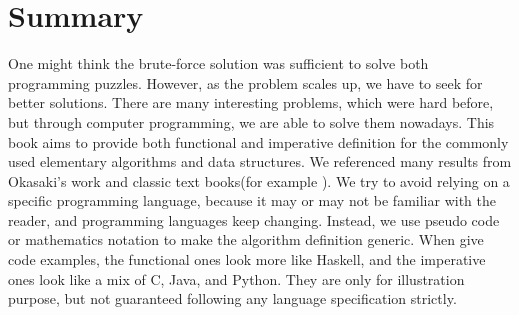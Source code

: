 \documentclass[b5paper]{article}
\begin{document}


\section{Summary}
One might think the brute-force solution was sufficient to solve both programming puzzles. However, as the problem scales up, we have to seek for better solutions. There are many interesting problems, which were hard before, but through computer programming, we are able to solve them nowadays. This book aims to provide both functional and imperative definition for the commonly used elementary algorithms and data structures. We referenced many results from Okasaki's work\cite{okasaki-book} and classic text books(for example \cite{CLRS}). We try to avoid relying on a specific programming language, because it may or may not be familiar with the reader, and programming languages keep changing. Instead, we use pseudo code or mathematics notation to make the algorithm definition generic. When give code examples, the functional ones look more like Haskell, and the imperative ones look like a mix of C, Java, and Python. They are only for illustration purpose, but not guaranteed following any language specification strictly.
\end{document}
